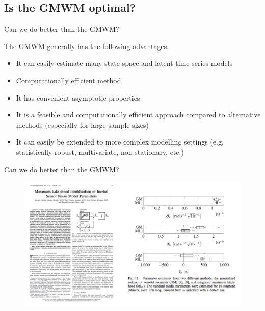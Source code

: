 \documentclass[envcountsect,usenames,dvipsnames]{beamer}
\theoremstyle{mystyle}
\begin{document}
\subsection{Is the GMWM optimal?}
\begin{frame}{Can we do better than the GMWM?}

The GMWM generally has the following advantages:
\begin{itemize}
    \item It can easily estimate many state-space and latent time series models
    \item Computationally efficient method
    \item It has convenient asymptotic properties
    \item It is a feasible and computationally efficient approach compared to alternative methods (especially for large sample sizes)
    \item It can easily be extended to more complex modelling settings (e.g. statistically robust, multivariate, non-stationary, etc.)
\end{itemize}

\end{frame}

\begin{frame}{Can we do better than the GMWM?}
\vspace{-0.5cm}
    \begin{figure}
    \centering
    \includegraphics[scale = 0.38]{Images/niko.jpg}
\end{figure}
\end{frame}
\end{document}
